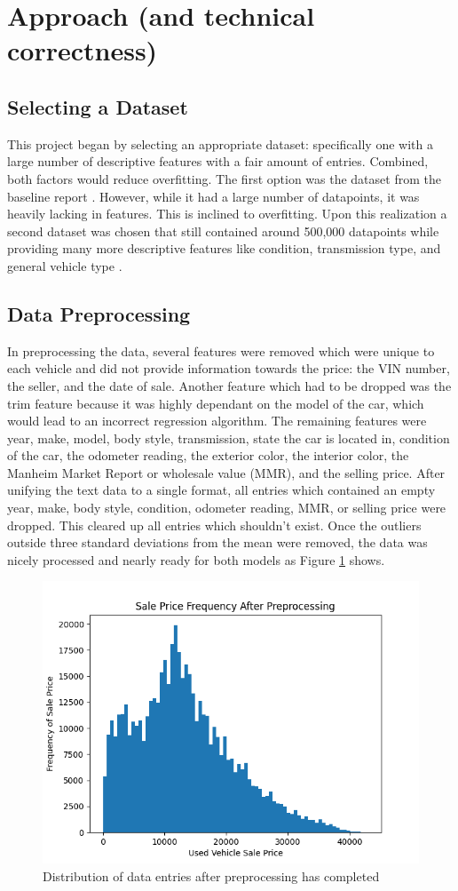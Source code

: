 \documentclass[compsoc]{IEEEtran}
\begin{document}
\section{Approach (and technical correctness)}
\subsection{Selecting a Dataset}
This project began by selecting an appropriate dataset: specifically one with a large number of descriptive features with a fair amount of entries. Combined, both factors would reduce overfitting. The first option was the dataset from the baseline report \cite{original_dataset}. However, while it had a large number of datapoints, it was heavily lacking in features. This is inclined to overfitting. Upon this realization a second dataset was chosen that still contained around 500,000 datapoints while providing many more descriptive features like condition, transmission type, and general vehicle type \cite{dataset}.
\subsection{Data Preprocessing}
In preprocessing the data, several features were removed which were unique to each vehicle and did not provide information towards the price: the VIN number, the seller, and the date of sale. Another feature which had to be dropped was the trim feature because it was highly dependant on the model of the car, which would lead to an incorrect regression algorithm. The remaining features were year, make, model, body style, transmission, state the car is located in, condition of the car, the odometer reading, the exterior color, the interior color, the Manheim Market Report or wholesale value \cite{website:mmr} (MMR), and the selling price. After unifying the text data to a single format, all entries which contained an empty year, make, body style, condition, odometer reading, MMR, or selling price were dropped. This cleared up all entries which shouldn't exist. Once the outliers outside three standard deviations from the mean were removed, the data was nicely processed and nearly ready for both models as Figure \ref{fig:preprocessing} shows.

\begin{figure}[h]
    \centering
    \includegraphics[width=.48\textwidth]{images/preprocessing.png}
    \caption{Distribution of data entries after preprocessing has completed}
    \label{fig:preprocessing}
\end{figure}
    
\end{document}
